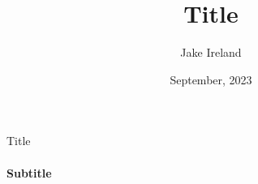 \documentclass[
	handout, %
	startingpause,
]{teamer}
\title{Title}
\date{September, 2023}
\author{Jake Ireland}
\begin{document}
\titleframe{}

\begin{frame}{Title}
  \framesubtitle{Subtitle}
\end{frame}

\end{document}
